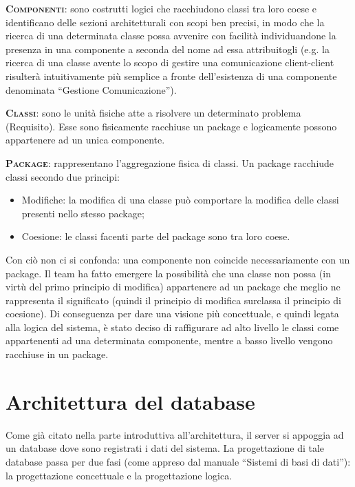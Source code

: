 \begin{description}
	\item{\scshape\bfseries Componenti}: sono costrutti logici che racchiudono classi tra loro coese e identificano delle sezioni architetturali con scopi ben precisi, in modo che la ricerca di una determinata classe possa avvenire con facilità individuandone la presenza in una componente a seconda del nome ad essa attribuitogli (e.g. la ricerca di una classe avente lo scopo di gestire una comunicazione client-client risulterà intuitivamente più semplice a fronte dell'esistenza di una componente denominata ``Gestione Comunicazione'').
	\item{\scshape\bfseries Classi}: sono le unità fisiche atte a risolvere un determinato problema (Requisito). Esse sono fisicamente racchiuse un package e logicamente possono appartenere ad un unica componente.
	\item{\scshape\bfseries Package}: rappresentano l'aggregazione fisica di classi. Un package racchiude classi secondo due principi:
		\begin{itemize}
			\item Modifiche: la modifica di una classe può comportare la modifica delle classi presenti nello stesso package;
			\item Coesione: le classi facenti parte del package sono tra loro coese.
		\end{itemize}
		
		Con ciò non ci si confonda: una componente non coincide necessariamente con un package. Il team ha fatto emergere la possibilità che una classe non possa (in virtù del primo principio di modifica) appartenere ad un package che meglio ne rappresenta il significato (quindi il principio di modifica surclassa il principio di coesione). Di conseguenza per dare una visione più concettuale, e quindi legata alla logica del sistema, è stato deciso di raffigurare ad alto livello le classi come appartenenti ad una determinata componente, mentre a basso livello vengono racchiuse in un package.
\end{description}

\clearpage

\section{Architettura del database}\label{sec:database}

Come già citato nella parte introduttiva all'architettura, il server si appoggia ad un database dove sono registrati i dati del sistema. La progettazione di tale database passa per due fasi (come appreso dal manuale ``Sistemi di basi di dati''): la progettazione concettuale e la progettazione logica.


